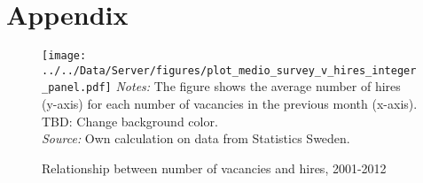 \appendix
\section{Appendix}
\label{sec:appendix}


\begin{figure}[h]
\centering
\caption{Relationship between number of vacancies and hires, 2001-2012}
\texttt{[image: ../../Data/Server/figures/plot\_medio\_survey\_v\_hires\_integer\_panel.pdf]}
\flushleft
\footnotesize{\emph{Notes:} The figure shows the average number of hires (y-axis) for each number of vacancies in the previous month (x-axis). TBD: Change background color.} \\
\footnotesize{\emph{Source:} Own calculation on data from Statistics Sweden.}
\label{fig:crossplot_panel}
\end{figure}








